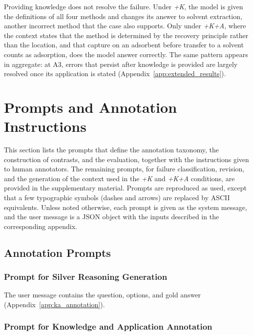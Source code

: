 Providing knowledge does not resolve the failure.
Under \textit{+K}, the model is given the definitions of all four methods and changes its answer to solvent extraction, another incorrect method that the case also supports.
Only under \textit{+K+A}, where the context states that the method is determined by the recovery principle rather than the location, and that capture on an adsorbent before transfer to a solvent counts as adsorption, does the model answer correctly.
The same pattern appears in aggregate: at A3, errors that persist after knowledge is provided are largely resolved once its application is stated (Appendix~\ref{app:extended_results}).



\section{Prompts and Annotation Instructions}
\label{app:prompts}

This section lists the prompts that define the annotation taxonomy, the construction of contrasts, and the evaluation, together with the instructions given to human annotators.
The remaining prompts, for failure classification, revision, and the generation of the context used in the \textit{+K} and \textit{+K+A} conditions, are provided in the supplementary material.
Prompts are reproduced as used, except that a few typographic symbols (dashes and arrows) are replaced by ASCII equivalents.
Unless noted otherwise, each prompt is given as the system message, and the user message is a JSON object with the inputs described in the corresponding appendix.

\subsection{Annotation Prompts}

\subsubsection{Prompt for Silver Reasoning Generation}

The user message contains the question, options, and gold answer (Appendix~\ref{app:ka_annotation}).


\subsubsection{Prompt for Knowledge and Application Annotation}


